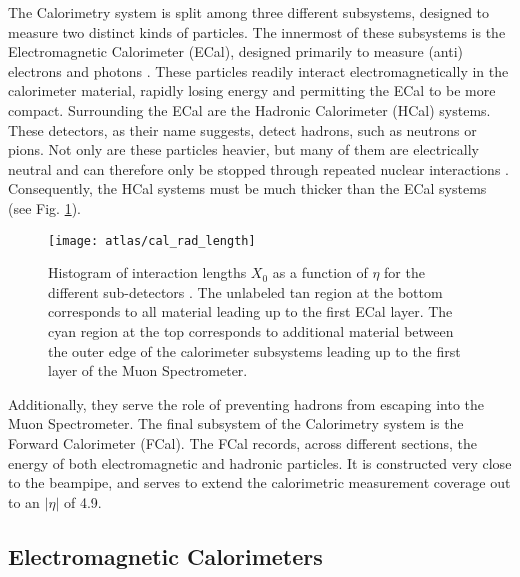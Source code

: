     The Calorimetry system is split among three different subsystems, designed to measure two distinct kinds of particles.
    The innermost of these subsystems is the Electromagnetic Calorimeter (ECal), designed primarily to measure (anti) electrons and photons \cite{calorimetry_lecture}.
    These particles readily interact electromagnetically in the calorimeter material, rapidly losing energy and permitting the ECal to be more compact.
    Surrounding the ECal are the Hadronic Calorimeter (HCal) systems.
    These detectors, as their name suggests, detect hadrons, such as neutrons or pions.
    Not only are these particles heavier, but many of them are electrically neutral and can therefore only be stopped through repeated nuclear interactions \cite{energy_measurement}.
    Consequently, the HCal systems must be much thicker than the ECal systems (see Fig. \ref{fig:cal_rad_length}).
    \begin{figure}
        \texttt{[image: atlas/cal\_rad\_length]}
        \caption{
            Histogram of interaction lengths $X_0$ as a function of $\eta$ for the different sub-detectors \cite{atlas_tdr}.
            The unlabeled tan region at the bottom corresponds to all material leading up to the first ECal layer.
            The cyan region at the top corresponds to additional material between the outer edge of the calorimeter subsystems
                leading up to the first layer of the Muon Spectrometer.
        }
        \label{fig:cal_rad_length}
    \end{figure}
    Additionally, they serve the role of preventing hadrons from escaping into the Muon Spectrometer.
    The final subsystem of the Calorimetry system is the Forward Calorimeter (FCal).
    The FCal records, across different sections, the energy of both electromagnetic and hadronic particles.
    It is constructed very close to the beampipe, and serves to extend the calorimetric measurement coverage out to an $|\eta|$ of 4.9.

    \subsection{Electromagnetic Calorimeters}

